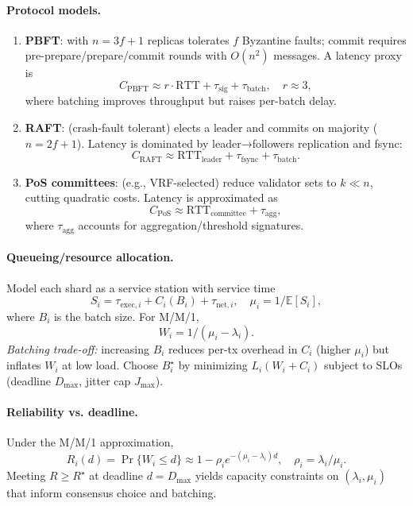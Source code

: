 \documentclass[12pt,onecolumn]{IEEEtran} %
\begin{document}
\paragraph{Protocol models.}
\begin{enumerate}
    \item \textbf{PBFT}: with $n=3f+1$ replicas tolerates $f$ Byzantine faults; commit requires pre-prepare/prepare/commit rounds with $O(n^2)$ messages. A latency proxy is
    \[
    C_{\mathrm{PBFT}} \approx r\cdot \mathrm{RTT} + \tau_{\mathrm{sig}} + \tau_{\mathrm{batch}},\quad r\approx 3,
    \]
    where batching improves throughput but raises per-batch delay.

    \item \textbf{RAFT}: (crash-fault tolerant) elects a leader and commits on majority ($n=2f+1$). Latency is dominated by leader→followers replication and fsync:
    \[
    C_{\mathrm{RAFT}} \approx \mathrm{RTT}_{\mathrm{leader}} + \tau_{\mathrm{fsync}} + \tau_{\mathrm{batch}}.
    \]

    \item \textbf{PoS committees}: (e.g., VRF-selected) reduce validator sets to $k\ll n$, cutting quadratic costs. Latency is approximated as
    \[
    C_{\mathrm{PoS}}\approx \mathrm{RTT}_{\text{committee}} + \tau_{\mathrm{agg}},
    \]
    where $\tau_{\mathrm{agg}}$ accounts for aggregation/threshold signatures.
\end{enumerate}

\paragraph{Queueing/resource allocation.}
Model each shard as a service station with service time
\[
S_i = \tau_{\mathrm{exec},i} + C_i(B_i) + \tau_{\mathrm{net},i},\quad \mu_i = 1/\mathbb{E}[S_i],
\]
where $B_i$ is the batch size. For M/M/1,
\[
W_i=1/(\mu_i-\lambda_i).
\]
\textit{Batching trade-off:} increasing $B_i$ reduces per-tx overhead in $C_i$ (higher $\mu_i$) but inflates $W_i$ at low load. Choose $B_i^\star$ by minimizing $L_i(W_i+C_i)$ subject to SLOs (deadline $D_{\max}$, jitter cap $J_{\max}$).

\paragraph{Reliability vs. deadline.}
Under the M/M/1 approximation,
\[
R_i(d)=\Pr\{W_i\le d\}\approx 1-\rho_i e^{-(\mu_i-\lambda_i)d},\quad \rho_i=\lambda_i/\mu_i.
\]
Meeting $R\ge R^\star$ at deadline $d=D_{\max}$ yields capacity constraints on $(\lambda_i,\mu_i)$ that inform consensus choice and batching.
\end{document}
